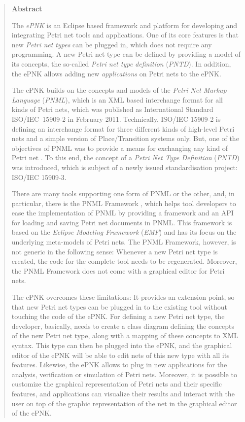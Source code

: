 \begin{quote}
\centerline{{\bf Abstract}}

The \emph{ePNK} is an Eclipse based framework and platform for developing
and integrating Petri net tools and applications. One of its core features
is that new \emph{Petri net types} can be plugged in, which does not require
any programming. A new Petri net type can be defined by providing a model
of its concepts, the so-called \emph{Petri net type definition} (\emph{PNTD}).
In addition, the ePNK allows adding new \emph{applications} on Petri nets
to the ePNK.

The ePNK builds on the concepts and models of the
\emph{Petri Net Markup Language} (\emph{PNML}), which is an XML based
interchange format for all kinds of Petri nets, which was published
as International Standard ISO/IEC~15909-2 in February 2011.
Technically, ISO/IEC 15909-2 is defining an interchange
format for three different kinds of high-level Petri nets and a simple version
of Place/Transition systems only. But, one of the objectives of PNML was to provide
a means for exchanging any kind of Petri net \cite{JKW00b,WeKi03,BCea03}. To this end, the concept of a 
\emph{Petri Net Type Definition} (\emph{PNTD}) was introduced, which is subject
of a newly issued standardisation project: ISO/IEC 15909-3.

There are many tools supporting one form of PNML or the other, and, in
particular, there is the PNML Framework \cite{DBLP:conf/apn/HillahKPT10}, which
helps tool developers to ease the implementation of PNML by providing a
framework and an API for loading and saving Petri net documents in PNML. This framework is
based on the \emph{Eclipse Modeling Framework} (\emph{EMF}) \cite{BSM06} and has
its focus on the underlying meta-models of Petri nets. The PNML Framework,
however, is not generic in the following sense: Whenever a new Petri net type is
created, the code for the complete tool needs to be regenerated.
Moreover, the PNML Framework does not come with a graphical editor
for Petri nets.

The ePNK overcomes these limitations: It provides an extension-point, so
that new Petri net types can be plugged in to the existing tool without
touching the code of the ePNK. For defining a new Petri net type, the developer,
basically, needs to create a class diagram defining the concepts of the new
Petri net type, along with a mapping of these concepts to XML syntax. This type can then
be plugged into the ePNK, and the graphical editor of the ePNK will be able
to edit nets of this new type with all its features. Likewise, the ePNK
allows to plug in new applications for the analysis, verification or
simulation of Petri nets. Moreover, it is possible to customize the
graphical representation of Petri nets and their specific features, and 
applications can visualize their results and interact with the user on top of
the graphic representation of the net in the graphical editor of the ePNK.


\end{quote}
